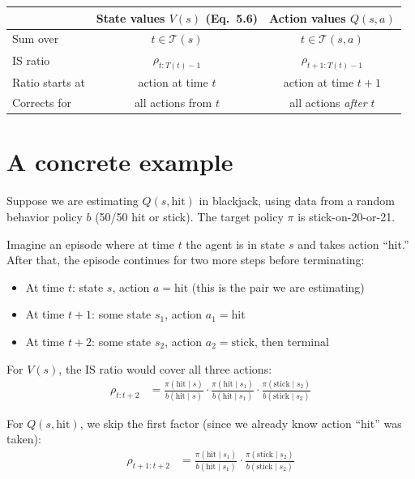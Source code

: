 \documentclass[11pt]{article}
\begin{document}
\begin{table}[H]
    \centering
    \begin{tabular}{lcc}
        \toprule
        & \textbf{State values $V(s)$} (Eq.~5.6) & \textbf{Action values $Q(s,a)$} \\
        \midrule
        Sum over & $t \in \mathcal{T}(s)$ & $t \in \mathcal{T}(s, a)$ \\
        \addlinespace
        IS ratio & $\rho_{t:T(t)-1}$ & $\rho_{t+1:T(t)-1}$ \\
        \addlinespace
        Ratio starts at & action at time $t$ & action at time $t+1$ \\
        \addlinespace
        Corrects for & all actions from $t$ & all actions \textit{after} $t$ \\
        \bottomrule
    \end{tabular}
\end{table}

\section*{A concrete example}

Suppose we are estimating $Q(s, \text{hit})$ in blackjack, using data from a random behavior policy $b$ (50/50 hit or stick). The target policy $\pi$ is stick-on-20-or-21.

Imagine an episode where at time $t$ the agent is in state $s$ and takes action ``hit.'' After that, the episode continues for two more steps before terminating:
\begin{itemize}[nosep]
    \item At time $t$: state $s$, action $a = \text{hit}$ (this is the pair we are estimating)
    \item At time $t+1$: some state $s_1$, action $a_1 = \text{hit}$
    \item At time $t+2$: some state $s_2$, action $a_2 = \text{stick}$, then terminal
\end{itemize}

For $V(s)$, the IS ratio would cover all three actions:
\begin{align}
    \rho_{t:t+2} &= \frac{\pi(\text{hit} \mid s)}{b(\text{hit} \mid s)} \cdot \frac{\pi(\text{hit} \mid s_1)}{b(\text{hit} \mid s_1)} \cdot \frac{\pi(\text{stick} \mid s_2)}{b(\text{stick} \mid s_2)}
\end{align}

For $Q(s, \text{hit})$, we skip the first factor (since we already know action ``hit'' was taken):
\begin{align}
    \rho_{t+1:t+2} &= \frac{\pi(\text{hit} \mid s_1)}{b(\text{hit} \mid s_1)} \cdot \frac{\pi(\text{stick} \mid s_2)}{b(\text{stick} \mid s_2)}
\end{align}
\end{document}
